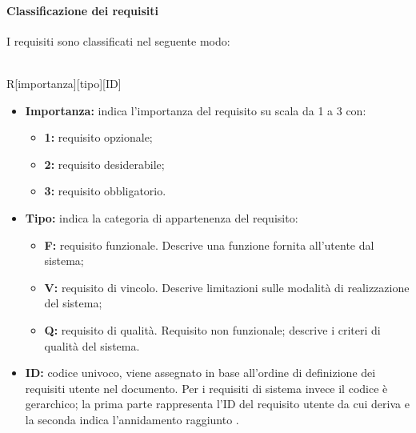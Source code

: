\paragraph{Classificazione dei requisiti}
I requisiti sono classificati nel seguente modo:\\\\
{\centering R[importanza][tipo][ID]
	
}
\begin{itemize}
	\item \textbf{Importanza:} indica l'importanza del requisito su scala da 1 a 3 con:
	\begin{itemize}
		\item \textbf{1:} requisito opzionale;
		\item \textbf{2:} requisito desiderabile;
		\item \textbf{3:} requisito obbligatorio.
	\end{itemize}
	\item \textbf{Tipo:} indica la categoria di appartenenza del requisito:
	\begin{itemize}
		\item \textbf{F:} requisito funzionale. Descrive una funzione fornita all'utente dal sistema;
		\item \textbf{V:} requisito di vincolo. Descrive limitazioni sulle modalità di realizzazione del sistema;
		\item \textbf{Q:} requisito di qualità. Requisito non funzionale; descrive i criteri di qualità del sistema.
	\end{itemize}
	\item \textbf{ID:} codice univoco, viene assegnato in base all'ordine di definizione dei requisiti utente nel documento. Per i requisiti di sistema invece il codice è gerarchico; la prima parte rappresenta l'ID del requisito utente da cui deriva e la seconda indica l'annidamento raggiunto . 
\end{itemize}


